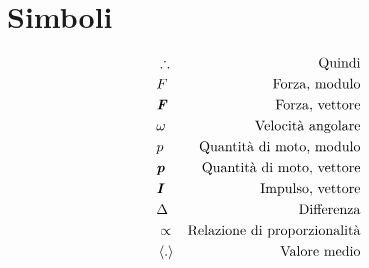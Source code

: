 \section{Simboli}

\begin{align*}
    &\therefore                & \text{Quindi}\\
    &F                         & \text{Forza, modulo}\\
    &\textbf{\textit{F}}               & \text{Forza, vettore}\\
    &\omega                    & \text{Velocità angolare}\\
    &p                         & \text{Quantità di moto, modulo}\\
    &\textbf{\textit{p}}               & \text{Quantità di moto, vettore}\\
    &\textbf{\textit{I}}               & \text{Impulso, vettore}\\
    &\Delta                    & \text{Differenza}\\
    &\propto                   & \text{Relazione di proporzionalità}\\
    &\left\langle.\right\rangle & \text{Valore medio}
\end{align*}